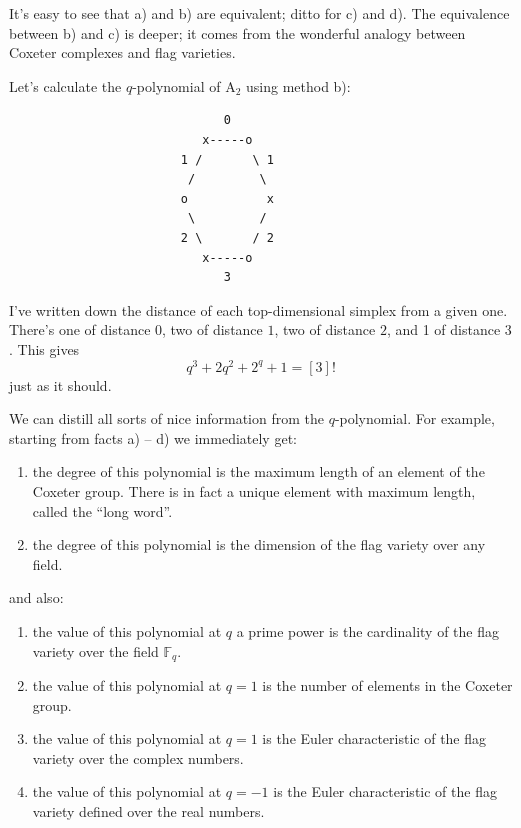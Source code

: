 \documentclass{article}
\begin{document}
It's easy to see that a) and b) are equivalent; ditto for c) and d). The
equivalence between b) and c) is deeper; it comes from the wonderful
analogy between Coxeter complexes and flag varieties.

Let's calculate the \(q\)-polynomial of \(\mathrm{A}_2\) using method
b):

\begin{verbatim}
                              0
                           x-----o
                        1 /       \ 1
                         /         \
                        o           x
                         \         /
                        2 \       / 2
                           x-----o
                              3
\end{verbatim}

I've written down the distance of each top-dimensional simplex from a
given one. There's one of distance \(0\), two of distance \(1\), two of
distance \(2\), and 1 of distance \(3\). This gives
\[q^3 + 2q^2 + 2^q + 1 =  [3]!\] just as it should.

We can distill all sorts of nice information from the \(q\)-polynomial.
For example, starting from facts a) -- d) we immediately get:

\begin{enumerate}
\def\labelenumi{\alph{enumi})}
\setcounter{enumi}{4}
\item
  the degree of this polynomial is the maximum length of an element of
  the Coxeter group. There is in fact a unique element with maximum
  length, called the ``long word''.
\item
  the degree of this polynomial is the dimension of the flag variety
  over any field.
\end{enumerate}

and also:

\begin{enumerate}
\def\labelenumi{\alph{enumi})}
\setcounter{enumi}{6}
\item
  the value of this polynomial at \(q\) a prime power is the cardinality
  of the flag variety over the field \(\mathbb{F}_q\).
\item
  the value of this polynomial at \(q = 1\) is the number of elements in
  the Coxeter group.
\item
  the value of this polynomial at \(q = 1\) is the Euler characteristic
  of the flag variety over the complex numbers.
\item
  the value of this polynomial at \(q = -1\) is the Euler characteristic
  of the flag variety defined over the real numbers.
\end{enumerate}
\end{document}
